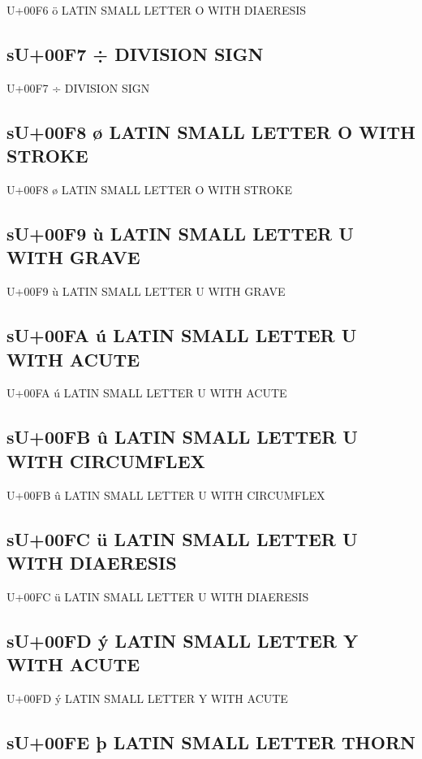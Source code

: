 U+00F6 ö  LATIN SMALL LETTER O WITH DIAERESIS

\subsection{sU+00F7 ÷  DIVISION SIGN}

U+00F7 ÷  DIVISION SIGN

\subsection{sU+00F8 ø  LATIN SMALL LETTER O WITH STROKE}

U+00F8 ø  LATIN SMALL LETTER O WITH STROKE

\subsection{sU+00F9 ù  LATIN SMALL LETTER U WITH GRAVE}

U+00F9 ù  LATIN SMALL LETTER U WITH GRAVE

\subsection{sU+00FA ú  LATIN SMALL LETTER U WITH ACUTE}

U+00FA ú  LATIN SMALL LETTER U WITH ACUTE

\subsection{sU+00FB û  LATIN SMALL LETTER U WITH CIRCUMFLEX}

U+00FB û  LATIN SMALL LETTER U WITH CIRCUMFLEX

\subsection{sU+00FC ü  LATIN SMALL LETTER U WITH DIAERESIS}

U+00FC ü  LATIN SMALL LETTER U WITH DIAERESIS

\subsection{sU+00FD ý  LATIN SMALL LETTER Y WITH ACUTE}

U+00FD ý  LATIN SMALL LETTER Y WITH ACUTE

\subsection{sU+00FE þ  LATIN SMALL LETTER THORN}

